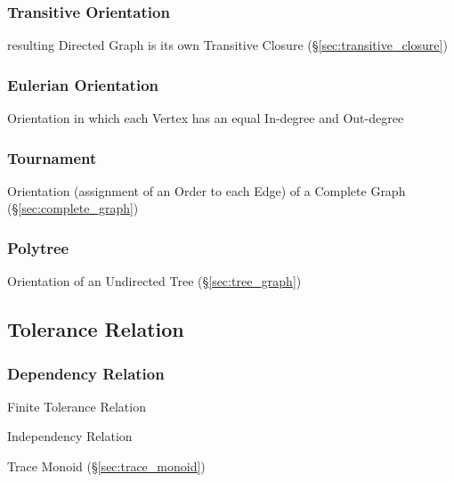 \subsubsection{Transitive Orientation}\label{sec:transitive_orientation}

resulting Directed Graph is its own Transitive Closure
(\S\ref{sec:transitive_closure})



\subsubsection{Eulerian Orientation}\label{sec:eulerian_orientation}

Orientation in which each Vertex has an equal In-degree and Out-degree



\subsubsection{Tournament}\label{sec:tournament}

Orientation (assignment of an Order to each Edge) of a Complete Graph
(\S\ref{sec:complete_graph})



\subsubsection{Polytree}\label{sec:polytree}

Orientation of an Undirected Tree (\S\ref{sec:tree_graph})



\subsection{Tolerance Relation}\label{sec:tolerance_relation}


\subsubsection{Dependency Relation}\label{sec:dependency_relation}

Finite Tolerance Relation

Independency Relation

Trace Monoid (\S\ref{sec:trace_monoid})



